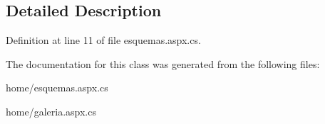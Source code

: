 \subsection{Detailed Description}


Definition at line 11 of file esquemas.\+aspx.\+cs.



The documentation for this class was generated from the following files\+:\begin{DoxyCompactItemize}
\item 
home/esquemas.\+aspx.\+cs\item 
home/galeria.\+aspx.\+cs\end{DoxyCompactItemize}
